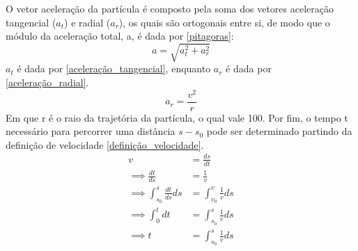\documentclass[12pt,a4paper]{article}
\begin{document}
\par O vetor aceleração da partícula é composto pela soma dos vetores aceleração tangencial ($a_t$) e radial ($a_r$), os quais são ortogonais entre si, de modo que o módulo da aceleração total, a, é dada por \eqref{pitagoras}:
\begin{equation}
    \label{pitagoras}
    a = \sqrt{a_t^2 + a_r^2}
\end{equation}
$a_t$ é dada por \eqref{aceleração_tangencial}, enquanto $a_r$ é dada por \eqref{aceleração_radial}.
\begin{equation}
    \label{aceleração_radial}
    a_r = \frac{v^2}{r}
\end{equation}
Em que r é o raio da trajetória da partícula, o qual vale 100. Por fim, o tempo t necessário para percorrer uma distância $s - s_0$ pode ser determinado partindo da definição de velocidade \eqref{definição_velocidade}.
\begin{align}
    \label{definição_velocidade}
    v&= \frac{ds}{dt} \\ \nonumber
    \implies \frac{dt}{ds} &= \frac{1}{v} \\ \nonumber
    \implies \int_{s_0}^{s} \frac{dt}{ds}ds &= \int_{v_0}^{v} \frac{1}{v}ds \\ \nonumber
    \implies \int_{0}^{t}dt &= \int_{s_0}^{s} \frac{1}{v}ds \\
    \label{um nome}
    \implies t &= \int_{s_0}^{s} \frac{1}{v}ds
\end{align}
\vspace{0.5\baselineskip}
\end{document}

